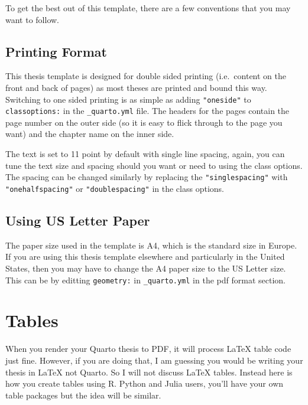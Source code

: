 \documentclass[
  letterpaper,
  11pt,
  spanish,
  singlespacing,
  headsepline]{MastersDoctoralThesis}
\begin{document}
To get the best out of this template, there are a few conventions that
you may want to follow.

\hypertarget{printing-format}{%
\subsection{Printing Format}\label{printing-format}}

This thesis template is designed for double sided printing (i.e.~content
on the front and back of pages) as most theses are printed and bound
this way. Switching to one sided printing is as simple as adding
\texttt{"oneside"} to \texttt{classoptions:} in the
\texttt{\_quarto.yml} file. The headers for the pages contain the page
number on the outer side (so it is easy to flick through to the page you
want) and the chapter name on the inner side.

The text is set to 11 point by default with single line spacing, again,
you can tune the text size and spacing should you want or need to using
the class options. The spacing can be changed similarly by replacing the
\texttt{"singlespacing"} with \texttt{"onehalfspacing"} or
\texttt{"doublespacing"} in the class options.

\hypertarget{using-us-letter-paper}{%
\subsection{Using US Letter Paper}\label{using-us-letter-paper}}

The paper size used in the template is A4, which is the standard size in
Europe. If you are using this thesis template elsewhere and particularly
in the United States, then you may have to change the A4 paper size to
the US Letter size. This can be by editting \texttt{geometry:} in
\texttt{\_quarto.yml} in the pdf format section.

\hypertarget{tables}{%
\section{Tables}\label{tables}}

When you render your Quarto thesis to PDF, it will process \LaTeX{}
table code just fine. However, if you are doing that, I am guessing you
would be writing your thesis in \LaTeX{} not Quarto. So I will not
discuss \LaTeX{} tables. Instead here is how you create tables using R.
Python and Julia users, you'll have your own table packages but the idea
will be similar.
\end{document}
